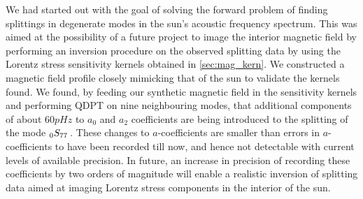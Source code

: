 We had started out with the goal of solving the forward problem of finding splittings in degenerate modes in the sun's acoustic frequency spectrum. This was aimed at the possibility of a future project to image the interior magnetic field by performing an inversion procedure on the observed splitting data by using the Lorentz stress sensitivity kernels obtained in \ref{sec:mag_kern}. We constructed a magnetic field profile closely mimicking that of the sun to validate the kernels found. We found, by feeding our synthetic magnetic field in the sensitivity kernels and performing QDPT on nine neighbouring modes, that additional components of about $60pHz$ to $a_0$ and $a_2$ coefficients are being introduced to the splitting of the mode $_{0}S_{77}\,$. These changes to $a$-coefficients are smaller than errors in $a$-coefficients to have been recorded till now, and hence not detectable with current levels of available precision. In future, an increase in precision of recording these coefficients by two orders of magnitude will enable a realistic inversion of splitting data aimed at imaging Lorentz stress components in the interior of the sun.

